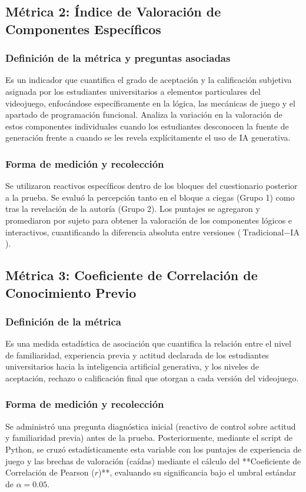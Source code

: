 \subsection{Métrica 2: Índice de Valoración de Componentes Específicos}

\subsubsection{Definición de la métrica y preguntas asociadas} 
Es un indicador que cuantifica el grado de aceptación y la calificación subjetiva asignada por los estudiantes universitarios a elementos particulares del videojuego, enfocándose específicamente en la lógica, las mecánicas de juego y el apartado de programación funcional. Analiza la variación en la valoración de estos componentes individuales cuando los estudiantes desconocen la fuente de generación frente a cuando se les revela explícitamente el uso de IA generativa.

\subsubsection{Forma de medición y recolección} 
Se utilizaron reactivos específicos dentro de los bloques del cuestionario posterior a la prueba. Se evaluó la percepción tanto en el bloque a ciegas (Grupo 1) como tras la revelación de la autoría (Grupo 2). Los puntajes se agregaron y promediaron por sujeto para obtener la valoración de los componentes lógicos e interactivos, cuantificando la diferencia absoluta entre versiones ($\text{Tradicional} - \text{IA}$).

\subsection{Métrica 3: Coeficiente de Correlación de Conocimiento Previo} 

\subsubsection{Definición de la métrica} 
Es una medida estadística de asociación que cuantifica la relación entre el nivel de familiaridad, experiencia previa y actitud declarada de los estudiantes universitarios hacia la inteligencia artificial generativa, y los niveles de aceptación, rechazo o calificación final que otorgan a cada versión del videojuego.

\subsubsection{Forma de medición y recolección} 
Se administró una pregunta diagnóstica inicial (reactivo de control sobre actitud y familiaridad previa) antes de la prueba. Posteriormente, mediante el script de Python, se cruzó estadísticamente esta variable con los puntajes de experiencia de juego y las brechas de valoración (caídas) mediante el cálculo del **Coeficiente de Correlación de Pearson ($r$)**, evaluando su significancia bajo el umbral estándar de $\alpha = 0.05$.

